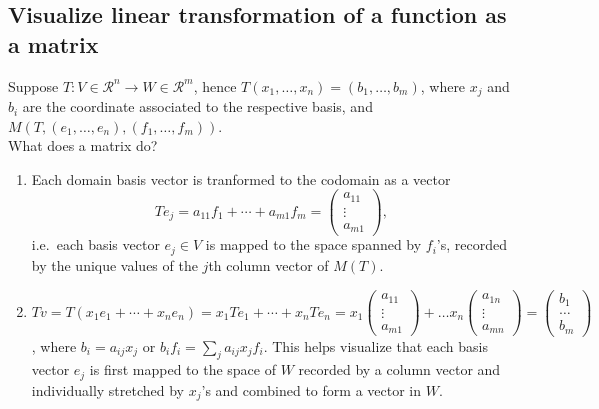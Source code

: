 

\subsection{Visualize linear transformation of a function as a matrix} 
Suppose $T: V \in \mathcal{R}^n \rightarrow W \in \mathcal{R}^m$, hence $T(x_1,\ldots,x_n) =
(b_1,\ldots,b_m)$, where $x_j$ and $b_i$ are the coordinate associated to the respective basis, and
$M(T,(e_1,\ldots,e_n),(f_1,\ldots,f_m))$. \\ 
What does a matrix do?  
\begin{enumerate} 
    \item Each domain basis vector is tranformed to the codomain as a vector 
        \begin{equation} 
            Te_j = a_{11}f_1 + \cdots + a_{m1}f_m = 
            \begin{pmatrix} a_{11} \\ \vdots \\ a_{m1} \end{pmatrix}, 
        \end{equation} 
        i.e.\, each basis vector $e_j \in V$ is mapped to the space spanned by $f_i$'s, recorded by the
        unique values of the $j$th column vector of $M(T)$.  
    \item $Tv = T(x_{1}e_{1} + \cdots + x_{n}e_{n}) = x_{1}Te_{1} + \cdots + x_{n}Te_{n} = x_{1}
        \begin{pmatrix} a_{11} \\ \vdots \\ a_{m1} \end{pmatrix} +
        \ldots x_{n} {\begin{pmatrix} a_{1n} \\ \vdots \\ a_{mn}\end{pmatrix}} =
        \begin{pmatrix} b_{1} \\ \ldots \\ b_{m} \end{pmatrix}$, where $b_{i} = a_{ij}
        x_{j}$ or $b_{i}f_{i} = \sum_{j} a_{ij} x_{j}f_{i}$. 
        This helps visualize that each basis vector $e_j$ is first mapped to the space of $W$ recorded by a
        column vector and individually stretched by $x_j$'s and combined to form a vector in $W$.  
\end{enumerate}

